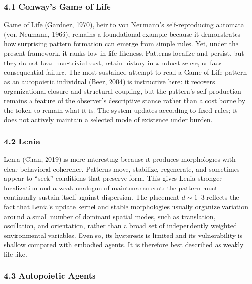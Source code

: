 \documentclass[Afour,sageh,times,doublespace]{sagej}
\begin{document}
\subsubsection{4.1 Conway's Game of Life}\label{conways-game-of-life}

Game of Life (Gardner, 1970), heir to von Neumann's self-reproducing automata (von Neumann, 1966), remains a foundational example because it demonstrates how surprising pattern formation can emerge from simple rules. Yet, under the present framework, it ranks low in life-likeness. Patterns localize and persist, but they do not bear non-trivial cost, retain history in a robust sense, or face consequential failure. The most sustained attempt to read a Game of Life pattern as an autopoietic individual (Beer, 2004) is instructive here: it recovers organizational closure and structural coupling, but the pattern's self-production remains a feature of the observer's descriptive stance rather than a cost borne by the token to remain what it is. The system updates according to fixed rules; it does not actively maintain a selected mode of existence under burden.

\subsubsection{4.2 Lenia}\label{lenia}

Lenia (Chan, 2019) is more interesting because it produces morphologies with clear behavioral coherence. Patterns move, stabilize, regenerate, and sometimes appear to ``seek'' conditions that preserve form. This gives Lenia stronger localization and a weak analogue of maintenance cost: the pattern must continually sustain itself against dispersion. The placement \(d \sim 1\text{--}3\) reflects the fact that Lenia's update kernel and stable morphologies usually organize variation around a small number of dominant spatial modes, such as translation, oscillation, and orientation, rather than a broad set of independently weighted environmental variables. Even so, its hysteresis is limited and its vulnerability is shallow compared with embodied agents. It is therefore best described as weakly life-like.

\subsubsection{4.3 Autopoietic Agents}\label{autopoietic-agents}
\end{document}
